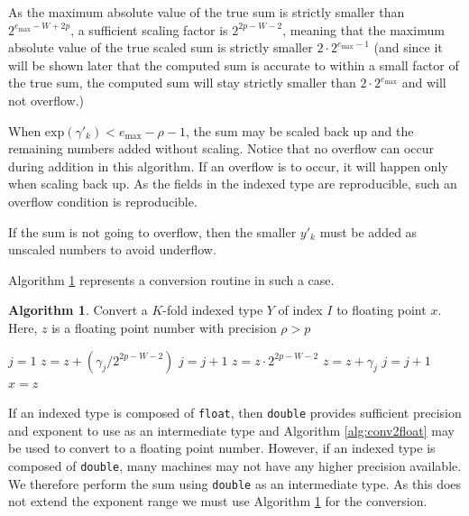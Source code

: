 \documentclass[12pt]{article}
\providecommand{\exp}{\ensuremath{\text{exp}}}
\providecommand{\max}{\ensuremath{\text{max}}}
\theoremstyle{definition}
\newtheorem{alg}{Algorithm}[section]
\numberwithin{equation}{section}
\numberwithin{figure}{section}
\begin{document}
    As the maximum absolute value of the true sum is strictly smaller than $2^{e_{\max} - W + 2  p}$, a sufficient scaling factor is $2^{2  p - W - 2}$, meaning that the maximum absolute value of the true scaled sum is strictly smaller $2 \cdot 2^{e_{\max} - 1}$ (and since it will be shown later that the computed sum is accurate to within a small factor of the true sum, the computed sum will stay strictly smaller than $2 \cdot 2^{e_{\max}}$ and will not overflow.)

  When $\exp(\gamma'_k) < e_{\max} - \rho - 1$, the sum may be scaled back up and the remaining numbers added without scaling. Notice that no overflow can occur during addition in this algorithm. If an overflow is to occur, it will happen only when scaling back up. As the fields in the indexed type are reproducible, such an overflow condition is reproducible.

    If the sum is not going to overflow, then the smaller $y'_k$ must be added as unscaled numbers to avoid underflow.

    Algorithm \ref{alg:conv2floatoverflow} represents a conversion routine in such a case.

    \begin{samepage}
    \begin{alg}
      Convert a $K$-fold indexed type $Y$ of index $I$ to floating point $x$. Here, $z$ is a floating point number with precision $\rho > p$
      \begin{algorithmic}[1]
          \State $j = 1$
          \While{$j \leq 2 K$ and $\exp(\gamma_j) \geq e_{\max} - \rho - 1$}
            \State $z = z + (\gamma_j / 2^{2 p - W - 2})$
            \State $j = j + 1$
          \EndWhile
          \State $z = z \cdot 2^{2 p - W - 2}$
            \State $z = z + \gamma_j$
            \State $j = j + 1$
          \EndWhile
          \State $x = z$
        \EndFunction
      \end{algorithmic}
      \label{alg:conv2floatoverflow}
    \end{alg}
    \end{samepage}

    If an indexed type is composed of \texttt{float}, then \texttt{double} provides sufficient precision and exponent to use as an intermediate type and Algorithm \ref{alg:conv2float} may be used to convert to a floating point number.
    However, if an indexed type is composed of \texttt{double}, many machines may not have any higher precision available. We therefore perform the sum using \texttt{double} as an intermediate type. As this does not extend the exponent range we must use Algorithm \ref{alg:conv2floatoverflow} for the conversion.
\end{document}
